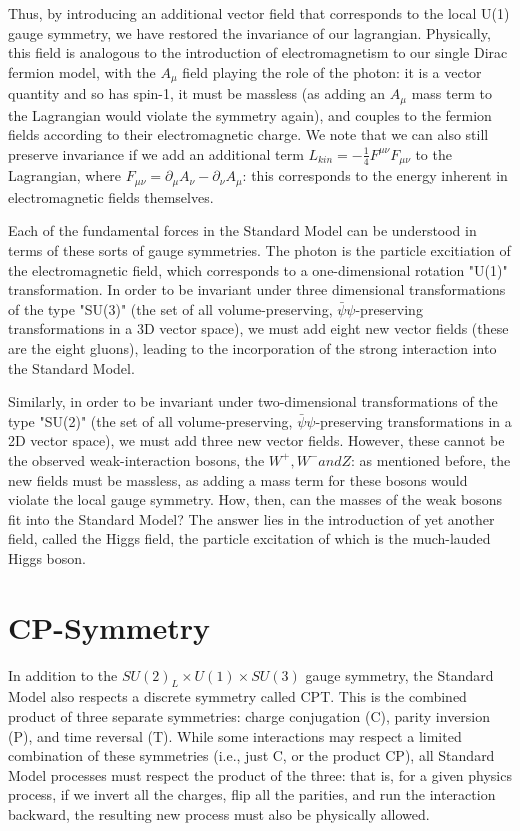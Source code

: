 Thus, by introducing an additional vector field that corresponds to the local U(1) gauge symmetry, we have restored the invariance of our lagrangian. Physically, this field is analogous to the introduction of electromagnetism to our single Dirac fermion model, with the $A_\mu$ field playing the role of the photon: it is a vector quantity and so has spin-1, it must be massless (as adding an $A_\mu$ mass term to the Lagrangian would violate the symmetry again), and couples to the fermion fields according to their electromagnetic charge. We note that we can also still preserve invariance if we add an additional term $L_{kin} = -\frac{1}{4}F^{\mu \nu} F_{\mu \nu}$ to the Lagrangian, where $F_{\mu \nu} = \partial_{\mu} A_{\nu} - \partial_{\nu} A_{\mu}$: this corresponds to the energy inherent in electromagnetic fields themselves. 

Each of the fundamental forces in the Standard Model can be understood in terms of these sorts of gauge symmetries. The photon is the particle excitiation of the electromagnetic field, which corresponds to a one-dimensional rotation "U(1)" transformation. In order to be invariant under three dimensional transformations of the type "SU(3)" (the set of all volume-preserving, $\bar{\psi}\psi$-preserving transformations in a 3D vector space), we must add eight new vector fields (these are the eight gluons), leading to the incorporation of the strong interaction into the Standard Model.

Similarly, in order to be invariant under two-dimensional transformations of the type "SU(2)" (the set of all volume-preserving, $\bar{\psi}\psi$-preserving transformations in a 2D vector space), we must add three new vector fields. However, these cannot be the observed weak-interaction bosons, the $W^{+}, W^{-} and Z$: as mentioned before, the new fields must be massless, as adding a mass term for these bosons would violate the local gauge symmetry. How, then, can the masses of the weak bosons fit into the Standard Model? The answer lies in the introduction of yet another field, called the Higgs field, the particle excitation of which is the much-lauded Higgs boson.

\section{CP-Symmetry}\label{sec:CPT}

In addition to the $SU(2)_{L} \times U(1) \times SU(3)$ gauge symmetry, the Standard Model also respects a discrete symmetry called CPT. This is the combined product of three separate symmetries: charge conjugation (C), parity inversion (P), and time reversal (T). While some interactions may respect a limited combination of these symmetries (i.e., just C, or the product CP), all Standard Model processes must respect the product of the three: that is, for a given physics process, if we invert all the charges, flip all the parities, and run the interaction backward, the resulting new process must also be physically allowed.

